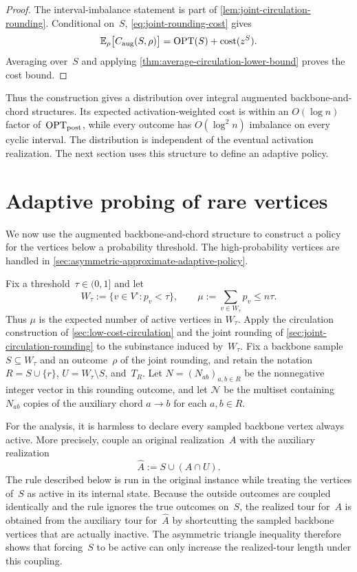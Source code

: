 \documentclass[12pt,a4paper,oneside]{report}
\begin{document}
\begin{proof}
The interval-imbalance statement is part of
\cref{lem:joint-circulation-rounding}.  Conditional on~$S$,
\cref{eq:joint-rounding-cost} gives
\[
    \mathbb{E}_\rho\bigl[C_{\mathrm{aug}}(S,\rho)\bigr]
    =\operatorname{OPT}(S)+\operatorname{cost}(z^S).
\]
Averaging over~$S$ and applying
\cref{thm:average-circulation-lower-bound} proves the cost bound.
\end{proof}

Thus the construction gives a distribution over integral augmented
backbone-and-chord structures.  Its expected activation-weighted cost is
within an $O(\log n)$ factor of~$\operatorname{OPT}_\mathrm{post}$, while every outcome has
$O(\log^2 n)$ imbalance on every cyclic interval.  The distribution is
independent of the eventual activation realization.  The next section uses
this structure to define an adaptive policy.

\section{Adaptive probing of rare vertices}
\label{sec:adaptive-probing-rare-vertices}

We now use the augmented backbone-and-chord structure to construct a policy
for the vertices below a probability threshold.
The high-probability vertices are handled in
\cref{sec:asymmetric-approximate-adaptive-policy}.

Fix a threshold~$\tau\in(0,1]$ and let
\[
    W_\tau:=\{v\in V^\circ:p_v<\tau\},
    \qquad
    \mu:=\sum_{v\in W_\tau}p_v\le n\tau.
\]
Thus $\mu$ is the expected number of active vertices in $W_\tau$.
Apply the circulation construction of \cref{sec:low-cost-circulation} and the
joint rounding of \cref{sec:joint-circulation-rounding} to the subinstance
induced by~$W_\tau$.  Fix a backbone sample
$S\subseteq W_\tau$ and an outcome~$\rho$ of the joint rounding, and retain
the notation $R=S\cup\{r\}$, $U=W_\tau\setminus S$, and~$T_R$.
Let $N=(N_{ab})_{a,b\in R}$ be the nonnegative integer vector in this rounding
outcome, and let $\mathcal N$ be the multiset containing $N_{ab}$ copies of
the auxiliary chord $a\to b$ for each $a,b\in R$.

For the analysis, it is harmless to declare every sampled backbone vertex
always active.  More precisely, couple an original realization~$A$ with the
auxiliary realization
\[
    \widehat A:=S\cup(A\cap U).
\]
The rule described below is run in the original instance while treating the
vertices of~$S$ as active in its internal state.  Because the outside outcomes
are coupled identically and the rule ignores the true outcomes on~$S$, the
realized tour for~$A$ is obtained from the auxiliary tour for~$\widehat A$ by
shortcutting the sampled backbone vertices that are actually inactive.  The
asymmetric triangle inequality therefore shows that forcing~$S$ to be active
can only increase the realized-tour length under this coupling.
\end{document}
